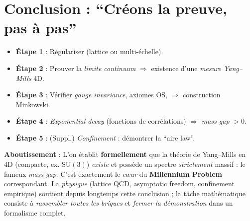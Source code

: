 \documentclass[11pt]{article}
\begin{document}
\section*{Conclusion : “Créons la preuve, pas à pas”}

\begin{itemize}
  \item \textbf{Étape 1} : Régulariser (lattice ou multi-échelle).
  \item \textbf{Étape 2} : Prouver la \emph{limite continuum} \(\Rightarrow\) existence d’une \emph{mesure Yang--Mills} 4D.
  \item \textbf{Étape 3} : Vérifier \emph{gauge invariance}, axiomes OS, $\Rightarrow$ construction Minkowski.
  \item \textbf{Étape 4} : \emph{Exponential decay} (fonctions de corrélations) $\Rightarrow$ \emph{mass gap} $>0$.
  \item \textbf{Étape 5} : (Suppl.) \emph{Confinement} : démontrer la “aire law”.
\end{itemize}

\noindent
\textbf{Aboutissement} : L’on établit \textbf{formellement} que la théorie de Yang--Mills en 4D (compacte, ex. \(\mathrm{SU}(3)\)) \emph{existe} et possède un spectre \emph{strictement} massif : le fameux \emph{mass gap}. C’est exactement le \emph{cœur} du \textbf{Millennium Problem} correspondant. La \emph{physique} (lattice QCD, asymptotic freedom, confinement empirique) soutient depuis longtemps cette conclusion ; la tâche mathématique consiste à \emph{rassembler toutes les briques} et \emph{fermer la démonstration} dans un formalisme complet. 
\end{document}
